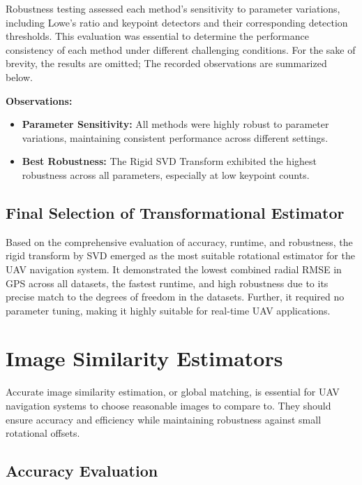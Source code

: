Robustness testing assessed each method's sensitivity to parameter variations, including Lowe’s ratio and keypoint detectors and their corresponding detection thresholds. This evaluation was essential to determine the performance consistency of each method under different challenging conditions. For the sake of brevity, the results are omitted; The recorded observations are summarized below.


\textbf{Observations:}  
\begin{itemize}
    \item \textbf{Parameter Sensitivity:} All methods were highly robust to parameter variations, maintaining consistent performance across different settings.
    \item \textbf{Best Robustness:} The Rigid SVD Transform exhibited the highest robustness across all parameters, especially at low keypoint counts.

\end{itemize}

\subsection{Final Selection of Transformational Estimator}

Based on the comprehensive evaluation of accuracy, runtime, and robustness, the rigid transform by SVD emerged as the most suitable rotational estimator for the UAV navigation system. It demonstrated the lowest combined radial RMSE in GPS across all datasets, the fastest runtime, and high robustness due to its precise match to the degrees of freedom in the datasets. Further, it required no parameter tuning, making it highly suitable for real-time UAV applications.





\section{Image Similarity Estimators}

Accurate image similarity estimation, or global matching, is essential for UAV navigation systems to choose reasonable images to compare to. They should ensure accuracy and efficiency while maintaining robustness against small rotational offsets. 

\subsection{Accuracy Evaluation}

